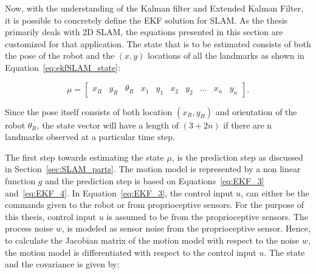 Now, with the understanding of the Kalman filter and Extended Kalman Filter, it is possible to concretely define the EKF solution for SLAM. As the thesis primarily deals with 2D SLAM, the equations presented in this section are customized for that application. The state that is to be estimated consists of both the pose of the robot and the $ (x,y) $ locations of all the landmarks as shown in Equation~\ref{eq:ekfSLAM_state}:

\begin{equation}
\mu = 
\begin{bmatrix}
x_R & y_R&\theta_R& x_1& y_1& x_2& y_2& \dots& x_n& y_n
\end{bmatrix}.
\label{eq:ekfSLAM_state}
\end{equation}

Since the pose itself consists of both location $ (x_R,y_R) $ and orientation of the robot $ \theta_R $, the state vector will have a length of $ (3+2n) $ if there are n landmarks observed at a particular time step.

The first step towards estimating the state $ \mu $, is the prediction step as discussed in Section~\ref{sec:SLAM_parts}. The motion model is represented by a non linear function $ g $ and the prediction step is based on Equations~\ref{eq:EKF_3} and~\ref{eq:EKF_4}. In Equation~\ref{eq:EKF_3}, the control input $ u $, can either be the commands given to the robot or from proprioceptive sensors. For the purpose of this thesis, control input $ u $ is assumed to be from the proprioceptive sensors. The process noise $ w $, is modeled as sensor noise from the proprioceptive sensor. Hence, to calculate the Jacobian matrix of the motion model with respect to the noise $ w $, the motion model is differentiated with respect to the control input $ u $. The state and the covariance is given by:


